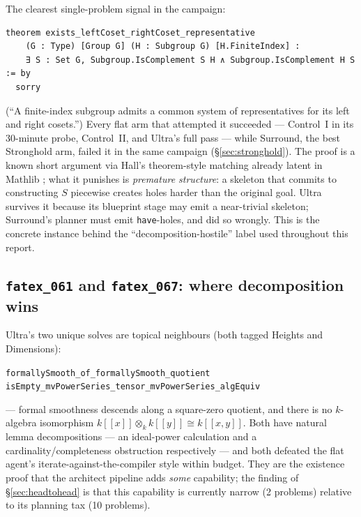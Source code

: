 \documentclass[12pt, a4paper]{article}
\newcommand{\run}[1]{\texttt{#1}}
\begin{document}
The clearest single-problem signal in the campaign:

\begin{lstlisting}
theorem exists_leftCoset_rightCoset_representative
    (G : Type) [Group G] (H : Subgroup G) [H.FiniteIndex] :
    ∃ S : Set G, Subgroup.IsComplement S H ∧ Subgroup.IsComplement H S := by
  sorry
\end{lstlisting}

\noindent
(``A finite-index subgroup admits a common system of representatives for its
left and right cosets.'') Every flat arm that attempted it succeeded ---
Control~I in its 30-minute probe, Control~II, and Ultra's full pass --- while
Surround, the best Stronghold arm, failed it in the same campaign
(\S\ref{sec:stronghold}). The proof is a known short argument via Hall's
theorem-style matching already latent in Mathlib \cite{mathlib2020}; what it
punishes is \emph{premature structure}: a skeleton that commits to
constructing $S$ piecewise creates holes harder than the original goal.
Ultra survives it because its blueprint stage may emit a near-trivial
skeleton; Surround's planner must emit \texttt{have}-holes, and did so
wrongly. This is the concrete instance behind the ``decomposition-hostile''
label used throughout this report.

\subsection{\run{fatex\_061} and \run{fatex\_067}: where decomposition wins}

Ultra's two unique solves are topical neighbours (both tagged Heights and
Dimensions):
\begin{center}\small
\run{formallySmooth\_of\_formallySmooth\_quotient}\\
\run{isEmpty\_mvPowerSeries\_tensor\_mvPowerSeries\_algEquiv}
\end{center}
\noindent
--- formal smoothness descends along a square-zero quotient, and there is no
$k$-algebra isomorphism $k[[x]] \otimes_k k[[y]] \cong k[[x,y]]$. Both have
natural lemma decompositions --- an ideal-power calculation and a
cardinality/completeness obstruction respectively --- and both defeated the
flat agent's iterate-against-the-compiler style within budget. They are the
existence proof that the architect pipeline adds \emph{some} capability;
the finding of \S\ref{sec:headtohead} is that this capability is currently
narrow (2 problems) relative to its planning tax (10 problems).
\end{document}
